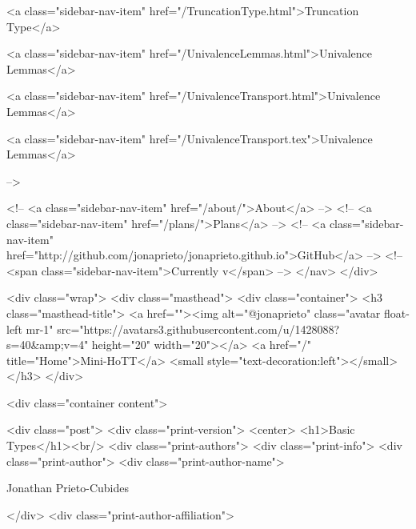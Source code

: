       
    
      
        
          <a class="sidebar-nav-item" href="/TruncationType.html">Truncation Type</a>
        
      
    
      
        
          <a class="sidebar-nav-item" href="/UnivalenceLemmas.html">Univalence Lemmas</a>
        
      
    
      
        
          <a class="sidebar-nav-item" href="/UnivalenceTransport.html">Univalence Lemmas</a>
        
      
    
      
        
          <a class="sidebar-nav-item" href="/UnivalenceTransport.tex">Univalence Lemmas</a>
        
      
     -->

    <!-- <a class="sidebar-nav-item" href="/about/">About</a> -->
    <!-- <a class="sidebar-nav-item" href="/plans/">Plans</a> -->
    <!-- <a class="sidebar-nav-item" href="http://github.com/jonaprieto/jonaprieto.github.io">GitHub</a> -->
    <!-- <span class="sidebar-nav-item">Currently v</span> -->
  </nav>
</div>

    <div class="wrap">
      <div class="masthead">
        <div class="container">
          <h3 class="masthead-title">
            <a href=""><img alt="@jonaprieto" class="avatar float-left mr-1" src="https://avatars3.githubusercontent.com/u/1428088?s=40&amp;v=4" height="20" width="20"></a>
            <a href="/" title="Home">Mini-HoTT</a>
            <small style="text-decoration:left"></small>
          </h3>
        </div>
      
      <div class="container content">
        







<div class="post">
  <div class="print-version">
    <center>
      <h1>Basic Types</h1><br/>
        <div class="print-authors">
          <div class="print-info">
            <div class="print-author">
              <div class="print-author-name">
                
                  Jonathan Prieto-Cubides
                
              </div>
              <div class="print-author-affiliation">
                
